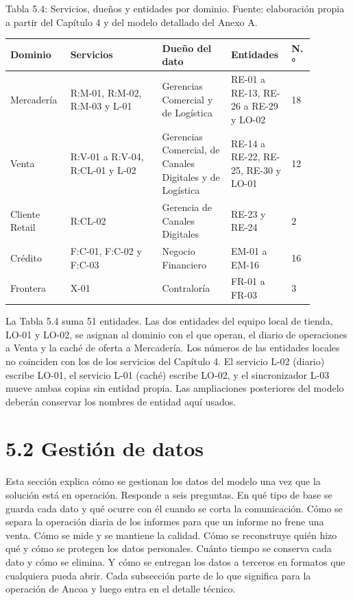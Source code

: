 \documentclass[11pt]{article}
\begin{document}
\par\vspace{0.6\baselineskip}\noindent\begin{minipage}{\linewidth}
Tabla 5.4: Servicios, dueños y entidades por dominio. Fuente: elaboración propia a partir del Capítulo 4 y del modelo detallado del Anexo A.\label{tab:t_ent}\par\vspace{0.3\baselineskip}
\begin{tabular}{@{}p{0.167\linewidth}p{0.280\linewidth}p{0.215\linewidth}p{0.151\linewidth}p{0.065\linewidth}@{}}
\toprule Dominio & Servicios & Dueño del dato & Entidades & N.° \\
\midrule
Mercadería & R:M-01, R:M-02, R:M-03 y L-01 & Gerencias Comercial y de Logística & RE-01 a RE-13, RE-26 a RE-29 y LO-02 & 18 \\
Venta & R:V-01 a R:V-04, R:CL-01 y L-02 & Gerencias Comercial, de Canales Digitales y de Logística & RE-14 a RE-22, RE-25, RE-30 y LO-01 & 12 \\
Cliente Retail & R:CL-02 & Gerencia de Canales Digitales & RE-23 y RE-24 & 2 \\
Crédito & F:C-01, F:C-02 y F:C-03 & Negocio Financiero & EM-01 a EM-16 & 16 \\
Frontera & X-01 & Contraloría & FR-01 a FR-03 & 3 \\
\bottomrule
\end{tabular}
\end{minipage}
\par


La Tabla 5.4 suma 51 entidades. Las dos entidades del equipo local de tienda, LO-01 y LO-02, se asignan al dominio con el que operan, el diario de operaciones a Venta y la caché de oferta a Mercadería. Los números de las entidades locales no coinciden con los de los servicios del Capítulo 4. El servicio L-02 (diario) escribe LO-01, el servicio L-01 (caché) escribe LO-02, y el sincronizador L-03 mueve ambas copias sin entidad propia. Las ampliaciones posteriores del modelo deberán conservar los nombres de entidad aquí usados.


\section{5.2 Gestión de datos}

Esta sección explica cómo se gestionan los datos del modelo una vez que la solución está en operación. Responde a seis preguntas. En qué tipo de base se guarda cada dato y qué ocurre con él cuando se corta la comunicación. Cómo se separa la operación diaria de los informes para que un informe no frene una venta. Cómo se mide y se mantiene la calidad. Cómo se reconstruye quién hizo qué y cómo se protegen los datos personales. Cuánto tiempo se conserva cada dato y cómo se elimina. Y cómo se entregan los datos a terceros en formatos que cualquiera pueda abrir. Cada subsección parte de lo que significa para la operación de Ancoa y luego entra en el detalle técnico.
\end{document}
